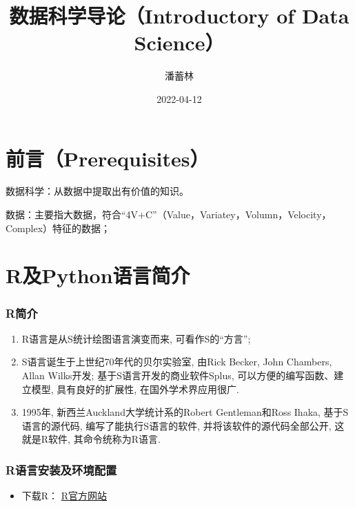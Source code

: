 \documentclass[
]{book}
\title{数据科学导论（Introductory of Data Science）}
\author{潘蓄林}
\date{2022-04-12}
\providecommand{\tightlist}{%
  \setlength{\itemsep}{0pt}\setlength{\parskip}{0pt}}
\begin{document}
\maketitle

{
\setcounter{tocdepth}{1}
\tableofcontents
}
\hypertarget{ux524dux8a00prerequisites}{%
\chapter{前言（Prerequisites）}\label{ux524dux8a00prerequisites}}

数据科学：从数据中提取出有价值的知识。

数据：主要指大数据，符合``4V+C''（Value，Variatey，Volumn，Velocity，Complex）特征的数据；

\hypertarget{rux53capythonux8bedux8a00ux7b80ux4ecb}{%
\chapter{R及Python语言简介}\label{rux53capythonux8bedux8a00ux7b80ux4ecb}}

\hypertarget{rux7b80ux4ecb}{%
\subsection{R简介}\label{rux7b80ux4ecb}}

\begin{enumerate}
\def\labelenumi{\arabic{enumi}.}
\tightlist
\item
  R语言是从S统计绘图语言演变而来, 可看作S的``方言'';
\item
  S语言诞生于上世纪70年代的贝尔实验室, 由Rick Becker, John Chambers, Allan Wilks开发; 基于S语言开发的商业软件Splus, 可以方便的编写函数、建立模型, 具有良好的扩展性, 在国外学术界应用很广.
\item
  1995年, 新西兰Auckland大学统计系的Robert Gentleman和Ross Ihaka, 基于S语言的源代码, 编写了能执行S语言的软件, 并将该软件的源代码全部公开, 这就是R软件, 其命令统称为R语言.
\end{enumerate}

\hypertarget{rux8bedux8a00ux5b89ux88c5ux53caux73afux5883ux914dux7f6e}{%
\subsection{R语言安装及环境配置}\label{rux8bedux8a00ux5b89ux88c5ux53caux73afux5883ux914dux7f6e}}

\begin{itemize}
\tightlist
\item
  下载R：
  \href{https://www.r-project.org/}{R官方网站}
\end{itemize}
\end{document}
